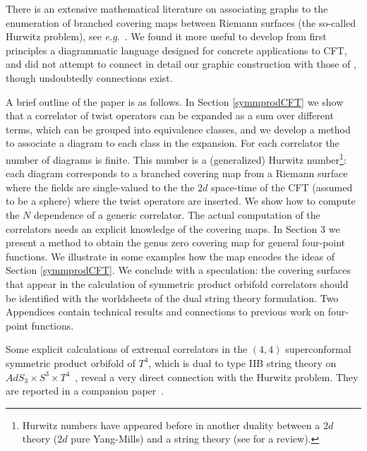 \documentclass[letterpaper]{JHEP3}
\begin{document}
There is an extensive  mathematical literature on associating graphs to the enumeration
of branched covering maps between Riemann surfaces (the so-called Hurwitz problem),
 see {\it e.g}.~\cite{Lando:2003gx,Lando2,Okounkov:2000gx,Mironov:2009cj}.  
We found it more useful to develop from first principles a diagrammatic
language  designed for  concrete applications to CFT, and did not attempt  to connect
in detail our graphic construction with those of \cite{Lando:2003gx,Lando2,Okounkov:2000gx,Mironov:2009cj},
though undoubtedly connections exist.

A brief outline of the paper is as follows.
 In Section \ref{symmprodCFT} we show that a correlator of twist operators can be expanded
as a sum over different terms, which can be grouped into equivalence classes, and we develop a method to associate a diagram to each class in the expansion.
For each correlator the number of diagrams is finite.  This number
is a (generalized) Hurwitz number\footnote{
Hurwitz numbers have appeared before in another duality between a $2d$ theory ($2d$ pure Yang-Mills)
and
a string theory \cite{Gross:1992tu,Gross:1993hu,Gross:1993yt} (see \cite{Cordes:1994fc} for a review). 
}:
each diagram corresponds to a branched covering 
map from a Riemann surface where the fields are single-valued to the
the $2d$ space-time of the CFT (assumed to be a sphere) where the twist operators are inserted.
We show how to compute the $N$ dependence of a generic correlator.
The actual computation of the correlators needs an explicit knowledge of the covering maps.
In Section 3  we present a method to obtain the genus zero covering 
 map for general four-point functions. 
We  illustrate in some examples how the map encodes  the ideas of Section \ref{symmprodCFT}.
We conclude with a speculation: the covering surfaces that appear in the calculation
of symmetric product orbifold correlators should be identified with the worldsheets of the dual string theory formulation.
Two Appendices contain technical results and connections to previous work \cite{Lunin:2000yv} on four-point functions.

Some explicit calculations of extremal correlators in the
 $(4,4)$ superconformal symmetric product orbifold of $T^4$, which is dual to type IIB string theory on $AdS_3 \times S^3 \times T^4$~\cite{Maldacena:1997re}, 
 reveal a very direct  connection with the Hurwitz problem. They  are reported in a companion paper~\cite{PRR2}.


\end{document}
